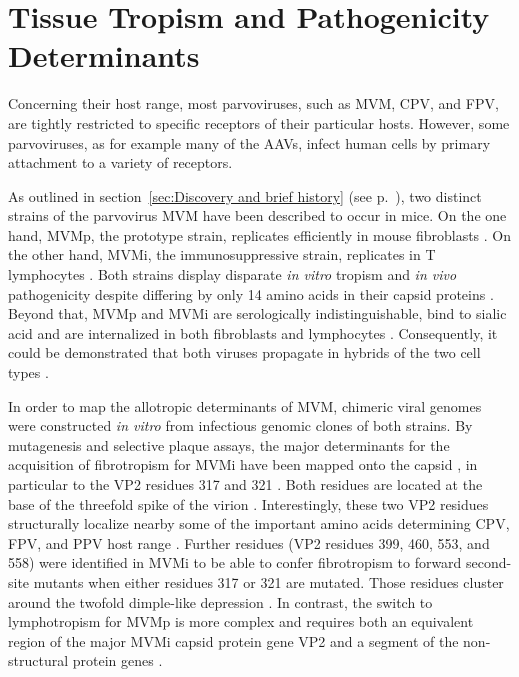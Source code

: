 
\newpage

\section{Tissue Tropism and Pathogenicity Determinants}
Concerning their host range, most parvoviruses, such as MVM,  CPV,  and FPV,  are tightly restricted to specific receptors of their particular hosts. However, some parvoviruses, as for example many of the AAVs,  infect human cells by primary attachment to a variety of receptors. 

As outlined in section~\ref{sec:Discovery and brief history} (see p.~\pageref{sec:Discovery and brief history}), two distinct strains of the parvovirus MVM have been described to occur in mice. On the one hand, MVMp,  the prototype strain, replicates efficiently in mouse fibroblasts \cite{pmid5945715}. On the other hand, MVMi, the immunosuppressive strain, replicates in T lymphocytes \cite{pmid1244418}.
Both strains display disparate \textit{in vitro} tropism and \textit{in vivo} pathogenicity despite differing by only 14 amino acids in their capsid proteins \cite{pmid1871965}. Beyond that, MVMp and MVMi are serologically indistinguishable, bind to sialic acid and are internalized in both fibroblasts and lymphocytes \cite{pmid6602221}. Consequently, it could be demonstrated that both viruses propagate in hybrids of the two cell types \cite{pmid6602222}.    

In order to map the allotropic determinants of MVM, chimeric viral genomes were constructed \textit{in vitro} from infectious genomic clones of both strains. By mutagenesis and selective plaque assays, the major determinants for the acquisition of fibrotropism for MVMi have been mapped onto the capsid \cite{pmid3257270, pmid9519837, pmid1871965}, in particular to the VP2 residues 317 and 321 \cite{pmid7637028, pmid1316457}. Both residues are located at the base of the threefold spike of the virion \cite{pmid3357208, pmid3392768, pmid3257270}. Interestingly, these two VP2 residues structurally localize nearby some of the important amino acids determining CPV, FPV, and PPV host range \cite{pmid14581558, pmid12941920, pmid1532105}. Further residues (VP2 residues 399, 460, 553, and 558) were identified in MVMi to be able to confer fibrotropism to forward second-site mutants when either residues 317 or 321 are mutated. Those residues cluster around the twofold dimple-like depression \cite{pmid9817841}. In contrast, the switch to lymphotropism for MVMp is more complex and requires both an equivalent region of the major MVMi capsid protein gene VP2 and a segment of the non-structural protein genes \cite{pmid9519837}.    

